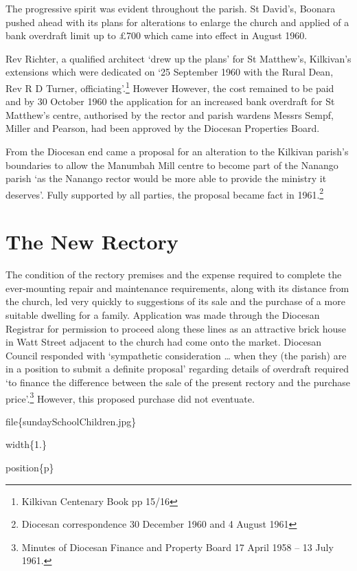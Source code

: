The progressive spirit was evident throughout the parish. St David's, Boonara pushed ahead with its plans for alterations to enlarge the church and applied of a bank overdraft limit up to £700 which came into effect in August 1960.

Rev Richter, a qualified architect `drew up the plans' for St Matthew's, Kilkivan's extensions which were dedicated on `25 September 1960 with the Rural Dean, Rev R D Turner, officiating'.\footnote{Kilkivan Centenary Book pp 15/16} However However, the cost remained to be paid and by 30 October 1960 the application for an increased bank overdraft for St Matthew's centre, authorised by the rector and parish wardens Messrs Sempf, Miller and Pearson, had been approved by the Diocesan Properties Board.

From the Diocesan end came a proposal for an alteration to the Kilkivan parish's boundaries to allow the Manumbah Mill centre to become part of the Nanango parish `as the Nanango rector would be more able to provide the ministry it deserves'. Fully supported by all parties, the proposal became fact in 1961.\footnote{Diocesan correspondence 30 December 1960 and 4 August 1961}

\hypertarget{the-new-rectory}{%
\section{The New Rectory}\label{the-new-rectory}}

The condition of the rectory premises and the expense required to complete the ever-mounting repair and maintenance requirements, along with its distance from the church, led very quickly to suggestions of its sale and the purchase of a more suitable dwelling for a family. Application was made through the Diocesan Registrar for permission to proceed along these lines as an attractive brick house in Watt Street adjacent to the church had come onto the market. Diocesan Council responded with `sympathetic consideration \ldots{} when they (the parish) are in a position to submit a definite proposal' regarding details of overdraft required `to finance the difference between the sale of the present rectory and the purchase price'.\footnote{Minutes of Diocesan Finance and Property Board 17 April 1958 -- 13 July 1961.} However, this proposed purchase did not eventuate.

file\{sundaySchoolChildren.jpg\}

width\{1.\}

position\{p\}

